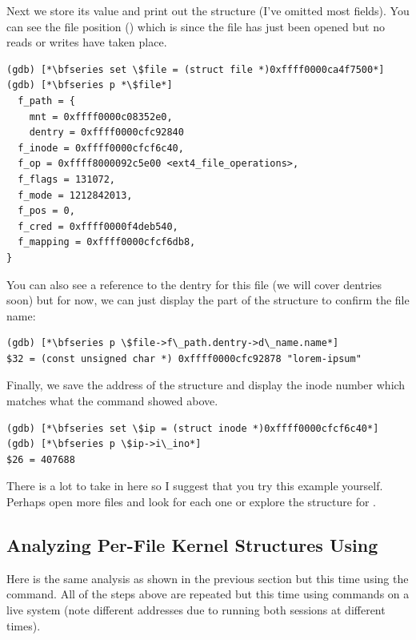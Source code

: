 Next we store its value and print out the  structure (I've omitted most fields). You can see the file position () which is  since the file has just been opened but no reads or writes have taken place.

\begin{lstlisting}
(gdb) [*\bfseries set \$file = (struct file *)0xffff0000ca4f7500*]
(gdb) [*\bfseries p *\$file*]
  f_path = {
    mnt = 0xffff0000c08352e0,
    dentry = 0xffff0000cfc92840
  f_inode = 0xffff0000cfcf6c40,
  f_op = 0xffff8000092c5e00 <ext4_file_operations>,
  f_flags = 131072,
  f_mode = 1212842013,
  f_pos = 0,
  f_cred = 0xffff0000f4deb540,
  f_mapping = 0xffff0000cfcf6db8,
}
\end{lstlisting}

\noindent
You can also see a reference to the dentry for this file (we will cover dentries soon) but for now, we can just display the part of the  structure to confirm the file name:

\begin{lstlisting}
(gdb) [*\bfseries p \$file->f\_path.dentry->d\_name.name*]
$32 = (const unsigned char *) 0xffff0000cfc92878 "lorem-ipsum"
\end{lstlisting}

\noindent
Finally, we save the address of the  structure and display the inode number which matches what the  command showed above.

\begin{lstlisting}
(gdb) [*\bfseries set \$ip = (struct inode *)0xffff0000cfcf6c40*]
(gdb) [*\bfseries p \$ip->i\_ino*]
$26 = 407688
\end{lstlisting}

\noindent
There is a lot to take in here so I suggest that you try this example yourself. Perhaps open more files and look for each one or explore the  structure for .


\subsection{Analyzing Per-File Kernel Structures Using }

Here is the same analysis as shown in the previous section but this time using the  command. All of the steps above are repeated but this time using  commands on a live system (note different addresses due to running both sessions at different times).


